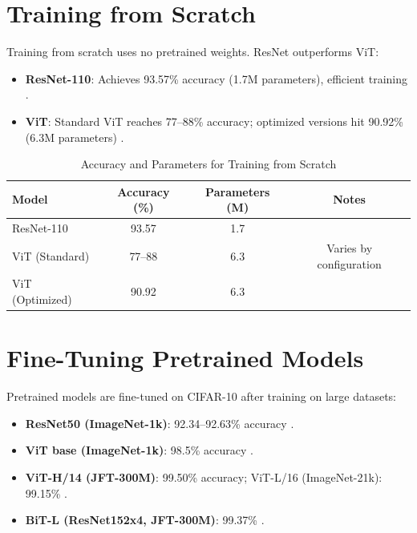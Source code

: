 \documentclass[UTF8]{report}
\theoremstyle{MyLineTheoremStyle} %
\theoremstyle{MyBlockTheoremStyle} %
\theoremstyle{MySubsubsectionStyle} %
\begin{document}
\section*{Training from Scratch}
Training from scratch uses no pretrained weights. ResNet outperforms ViT:
\begin{itemize}
    \item \textbf{ResNet-110}: Achieves 93.57\% accuracy (1.7M parameters), efficient training \cite{he2016deep}.
    \item \textbf{ViT}: Standard ViT reaches 77–88\% accuracy; optimized versions hit 90.92\% (6.3M parameters) \cite{omihub777vitcifar, kentaroy47vit}.
\end{itemize}

\begin{table}[h]
\centering
\caption{Accuracy and Parameters for Training from Scratch}
\begin{tabular}{lccc}
\toprule
Model & Accuracy (\%) & Parameters (M) & Notes \\
\midrule
ResNet-110 & 93.57 & 1.7 & \cite{he2016deep} \\
ViT (Standard) & 77–88 & 6.3 & Varies by configuration \cite{kentaroy47vit} \\
ViT (Optimized) & 90.92 & 6.3 & \cite{omihub777vitcifar} \\
\bottomrule
\end{tabular}
\end{table}

\section*{Fine-Tuning Pretrained Models}
Pretrained models are fine-tuned on CIFAR-10 after training on large datasets:
\begin{itemize}
    \item \textbf{ResNet50 (ImageNet-1k)}: 92.34–92.63\% accuracy \cite{sidthoviti}.
    \item \textbf{ViT base (ImageNet-1k)}: 98.5\% accuracy \cite{kentaroy47vit}.
    \item \textbf{ViT-H/14 (JFT-300M)}: 99.50\% accuracy; ViT-L/16 (ImageNet-21k): 99.15\% \cite{dosovitskiy2020image}.
    \item \textbf{BiT-L (ResNet152x4, JFT-300M)}: 99.37\% \cite{dosovitskiy2020image}.
\end{itemize}
\end{document}

